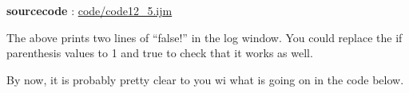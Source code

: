 \textbf{sourcecode} : \href{http://www.example.com/contents}{code/code12\_5.ijm}

The above prints two lines of ``false!'' in the log window. You could replace
the if parenthesis values to 1 and true to check that it works as well.

By now, it is probably pretty clear to you wi what is going on in the code below.